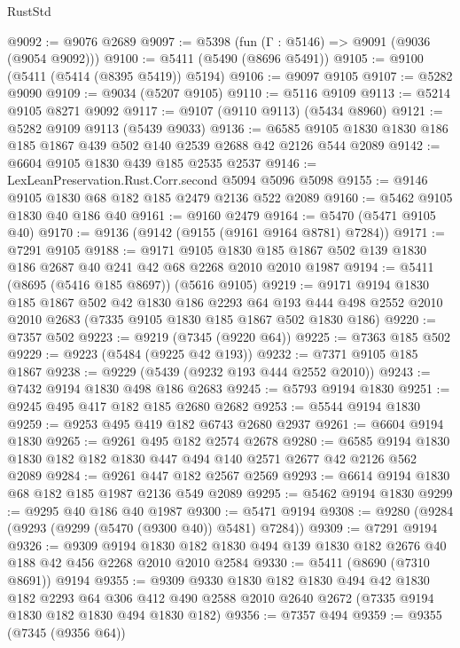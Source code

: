\begin{lexlean}{RustStd}
\begin{coremodule}
{\begin{coremodule}
{{{{{{{{{{{{{{{{{{{{{{{{{{{{{{{@9092 := @9076 @2689
@9097 := @5398 (fun (Γ : @5146) => @9091 (@9036 (@9054 @9092)))
@9100 := @5411 (@5490 (@8696 @5491))
@9105 := @9100 (@5411 (@5414 (@8395 @5419)) @5194)
@9106 := @9097 @9105
@9107 := @5282 @9090
@9109 := @9034 (@5207 @9105)
@9110 := @5116 @9109
@9113 := @5214 @9105 @8271 @9092
@9117 := @9107 (@9110 @9113) (@5434 @8960)
@9121 := @5282 @9109 @9113 (@5439 @9033)
@9136 := @6585 @9105 @1830 @1830 @186 @185 @1867 @439 @502 @140 @2539 @2688 @42 @2126 @544 @2089
@9142 := @6604 @9105 @1830 @439 @185 @2535 @2537
@9146 := LexLeanPreservation.Rust.Corr.second @5094 @5096 @5098
@9155 := @9146 @9105 @1830 @68 @182 @185 @2479 @2136 @522 @2089
@9160 := @5462 @9105 @1830 @40 @186 @40
@9161 := @9160 @2479
@9164 := @5470 (@5471 @9105 @40)
@9170 := @9136 (@9142 (@9155 (@9161 @9164 @8781) @7284))
@9171 := @7291 @9105
@9188 := @9171
    @9105
    @1830
    @185
    @1867
    @502
    @139
    @1830
    @186
    @2687
    @40
    @241
    @42
    @68
    @2268
    @2010
    @2010
    @1987
@9194 := @5411 (@8695 (@5416 @185 @8697)) (@5616 @9105)
@9219 := @9171
    @9194
    @1830
    @185
    @1867
    @502
    @42
    @1830
    @186
    @2293
    @64
    @193
    @444
    @498
    @2552
    @2010
    @2010
    @2683
    (@7335 @9105 @1830 @185 @1867 @502 @1830 @186)
@9220 := @7357 @502
@9223 := @9219 (@7345 (@9220 @64))
@9225 := @7363 @185 @502
@9229 := @9223 (@5484 (@9225 @42 @193))
@9232 := @7371 @9105 @185 @1867
@9238 := @9229 (@5439 (@9232 @193 @444 @2552 @2010))
@9243 := @7432 @9194 @1830 @498 @186 @2683
@9245 := @5793 @9194 @1830
@9251 := @9245 @495 @417 @182 @185 @2680 @2682
@9253 := @5544 @9194 @1830
@9259 := @9253 @495 @419 @182 @6743 @2680 @2937
@9261 := @6604 @9194 @1830
@9265 := @9261 @495 @182 @2574 @2678
@9280 := @6585 @9194 @1830 @1830 @182 @182 @1830 @447 @494 @140 @2571 @2677 @42 @2126 @562 @2089
@9284 := @9261 @447 @182 @2567 @2569
@9293 := @6614 @9194 @1830 @68 @182 @185 @1987 @2136 @549 @2089
@9295 := @5462 @9194 @1830
@9299 := @9295 @40 @186 @40 @1987
@9300 := @5471 @9194
@9308 := @9280 (@9284 (@9293 (@9299 (@5470 (@9300 @40)) @5481) @7284))
@9309 := @7291 @9194
@9326 := @9309
    @9194
    @1830
    @182
    @1830
    @494
    @139
    @1830
    @182
    @2676
    @40
    @188
    @42
    @456
    @2268
    @2010
    @2010
    @2584
@9330 := @5411 (@8690 (@7310 @8691)) @9194
@9355 := @9309
    @9330
    @1830
    @182
    @1830
    @494
    @42
    @1830
    @182
    @2293
    @64
    @306
    @412
    @490
    @2588
    @2010
    @2640
    @2672
    (@7335 @9194 @1830 @182 @1830 @494 @1830 @182)
@9356 := @7357 @494
@9359 := @9355 (@7345 (@9356 @64))
}}}}}}}}}}}}}}}}}}}}}}}}}}}}}}}
\end{coremodule}}
\end{coremodule}
\end{lexlean}
